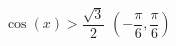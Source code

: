 { $\cos \left( x \right) > \dfrac{\sqrt{3}}{2}$ }
{ $\left( -\dfrac{\pi}{6}, \dfrac{\pi}{6} \right)$}
